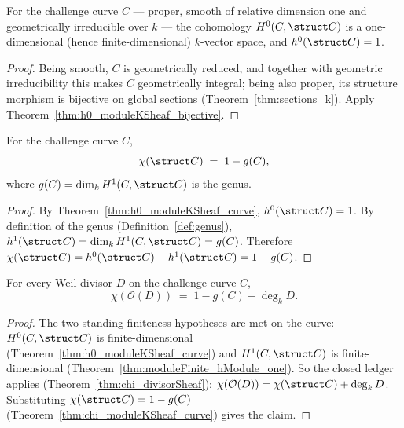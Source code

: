 \begin{theorem}
  \label{thm:h0_moduleKSheaf_curve}
  \leanok
  For the challenge curve \(C\) --- proper, smooth of relative dimension one and geometrically
  irreducible over \(k\) --- the cohomology \(H^0(C, \struct C)\) is a one-dimensional (hence
  finite-dimensional) \(k\)-vector space, and \(h^0(\struct C) = 1\).
\end{theorem}
\begin{proof}
  \leanok
  Being smooth, \(C\) is geometrically reduced, and together with geometric irreducibility this
  makes \(C\) geometrically integral; being also proper, its structure morphism is bijective on
  global sections (Theorem~\ref{thm:sections_k}). Apply
  Theorem~\ref{thm:h0_moduleKSheaf_bijective}.
\end{proof}

\begin{theorem}
  \label{thm:chi_moduleKSheaf_curve}
  \leanok
  For the challenge curve \(C\),
  \[
    \chi(\struct C) \;=\; 1 - g(C),
  \]
  where \(g(C) = \dim_k H^1(C, \struct C)\) is the genus.
\end{theorem}
\begin{proof}
  \leanok
  By Theorem~\ref{thm:h0_moduleKSheaf_curve}, \(h^0(\struct C) = 1\). By definition of the genus
  (Definition~\ref{def:genus}), \(h^1(\struct C) = \dim_k H^1(C, \struct C) = g(C)\). Therefore
  \(\chi(\struct C) = h^0(\struct C) - h^1(\struct C) = 1 - g(C)\).
\end{proof}

\begin{theorem}
  \label{thm:chi_divisorSheaf_curve}
  \leanok
  For every Weil divisor \(D\) on the challenge curve \(C\),
  \[
    \chi(\mathcal O(D)) \;=\; 1 - g(C) + \deg_k D .
  \]
\end{theorem}
\begin{proof}
  \leanok
  The two standing finiteness hypotheses are met on the curve: \(H^0(C, \struct C)\) is
  finite-dimensional (Theorem~\ref{thm:h0_moduleKSheaf_curve}) and \(H^1(C, \struct C)\) is
  finite-dimensional (Theorem~\ref{thm:moduleFinite_hModule_one}). So the closed ledger applies
  (Theorem~\ref{thm:chi_divisorSheaf}): \(\chi(\mathcal O(D)) = \chi(\struct C) + \deg_k D\).
  Substituting \(\chi(\struct C) = 1 - g(C)\) (Theorem~\ref{thm:chi_moduleKSheaf_curve}) gives
  the claim.
\end{proof}

